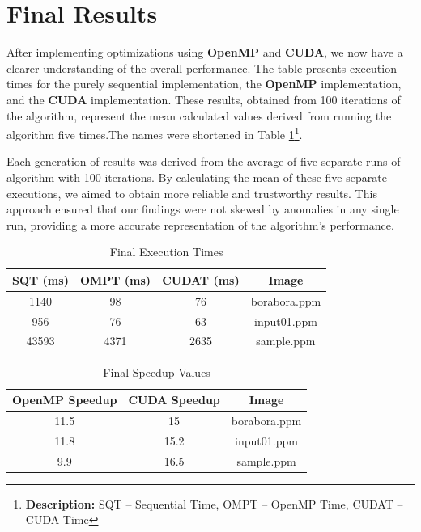 \documentclass[sigconf]{acmart}
\begin{document}
\section{Final Results}
After implementing optimizations using \textbf{OpenMP} and \textbf{CUDA}, we now have a clearer understanding of the overall performance. The table presents execution times for the purely sequential implementation, the \textbf{OpenMP} implementation, and the \textbf{CUDA} implementation. These results, obtained from 100 iterations of the algorithm, represent the mean calculated values derived from running the algorithm five times.The names were shortened in Table \ref{table:final}\footnote{\textbf{Description:} SQT -- Sequential Time, OMPT -- OpenMP Time, CUDAT -- CUDA Time}.

Each generation of results was derived from the average of five separate runs of algorithm with 100 iterations. By calculating the mean of these five separate executions, we aimed to obtain more reliable and trustworthy results. This approach ensured that our findings were not skewed by anomalies in any single run, providing a more accurate representation of the algorithm's performance.

\begin{table}[h!]
\centering
\begin{tabular}{|c|c|c|c|}
\hline
\textbf{SQT (ms)} & \textbf{OMPT (ms)} & \textbf{CUDAT (ms)} & \textbf{Image} \\
\hline
1140 & 98 & 76 & borabora.ppm \\
\hline
956 & 76 & 63 & input01.ppm \\
\hline
43593 & 4371 & 2635 & sample.ppm \\
\hline
\end{tabular}
\vspace{0.2cm} %
\caption{Final Execution Times}
\label{table:final}
\end{table}

\begin{table}[h!]
\centering
\begin{tabular}{|c|c|c|}
\hline
\textbf{OpenMP Speedup} & \textbf{CUDA Speedup} & \textbf{Image} \\
\hline
11.5 & 15 & borabora.ppm \\
\hline
11.8 & 15.2 & input01.ppm \\
\hline
9.9 & 16.5 & sample.ppm \\
\hline
\end{tabular}
\vspace{0.2cm} %
\caption{Final Speedup Values}
\label{table:speeds}
\end{table}
\end{document}
